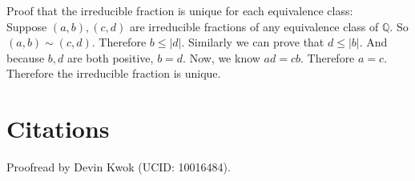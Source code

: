 \documentclass[10pt, letterpaper, titlepage]{article}
\newcommand\abs[1]{\left|#1\right|}
\newcommand{\Q}{\mathbb{Q}}
\begin{document}
    Proof that the irreducible fraction is unique for each equivalence class: \\ 
    Suppose $(a,b), (c,d)$ are irreducible fractions of any equivalence class of $\Q$.
    So $(a,b) \sim (c,d)$.
    Therefore $b \leq \abs{d}$.
    Similarly we can prove that $d \leq \abs{b}$.
    And because $b,d$ are both positive, 
    $b = d$.
    Now, we know $ad = cb$.
    Therefore $a = c$.
    Therefore the irreducible fraction is unique.
    
    

    \section*{Citations}
    Proofread by Devin Kwok (UCID: 10016484).
\end{document}
